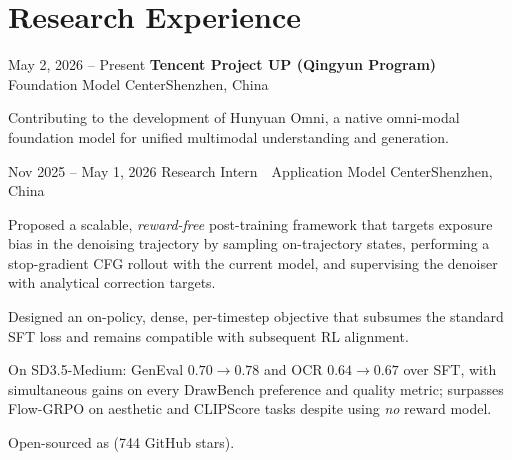 \section{Research Experience}

\cvBlockStart

  \item
  \cvHeading
    {}{May 2, 2026 -- Present}
    {\textbf{Tencent Project UP (Qingyun Program)} \,\textperiodcentered\, Foundation Model Center}{Shenzhen, China}


  \cvListStart
    \item Contributing to the development of Hunyuan Omni, a native omni-modal foundation model for unified multimodal understanding and generation.
  \cvListEnd

  \item
  \cvHeading
    {}{Nov 2025 -- May 1, 2026}
    {Research Intern \,\textperiodcentered\, Application Model Center}{Shenzhen, China}


  \cvListStart
    \item Proposed a scalable, \emph{reward-free} post-training framework that targets exposure bias in the denoising trajectory by sampling on-trajectory states, performing a stop-gradient CFG rollout with the current model, and supervising the denoiser with analytical correction targets.
    \item Designed an on-policy, dense, per-timestep objective that subsumes the standard SFT loss and remains compatible with subsequent RL alignment.
    \item On SD3.5-Medium: GenEval $\mathbf{0.70 \rightarrow 0.78}$ and OCR $\mathbf{0.64 \rightarrow 0.67}$ over SFT, with simultaneous gains on every DrawBench preference and quality metric; surpasses Flow-GRPO on aesthetic and CLIPScore tasks despite using \emph{no} reward model.
    \item Open-sourced as  (744 GitHub stars).
  \cvListEnd

